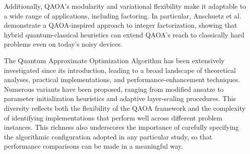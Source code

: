 Additionally, QAOA's modularity and variational flexibility make it adaptable to a wide range of applications, including factoring. In particular, Anschuetz et al.~\cite{anschuetz_variational_2018} demonstrate a QAOA-inspired approach to integer factorization, showing that hybrid quantum-classical heuristics can extend QAOA's reach to classically hard problems even on today's noisy devices.

The Quantum Approximate Optimization Algorithm has been extensively investigated since its introduction, leading to a broad landscape of theoretical analyses, practical  implementations, and performance-enhancement techniques. Numerous variants have been proposed, ranging from modified ansatze to parameter initialization heuristics and adaptive layer-scaling procedures. This diversity reflects both the flexibility of the QAOA framework and the complexity of identifying implementations that perform well across different problem instances. This richness also underscores the importance of carefully specifying the algorithmic configuration adopted in any particular study, so that performance comparisons can be made in a meaningful way.